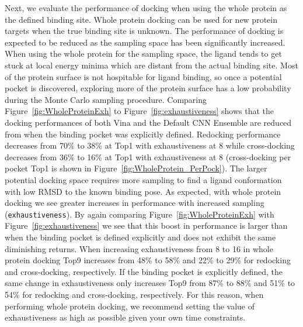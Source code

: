 \documentclass[journal=jcisd8,manuscript=article]{achemso}
\begin{document}
Next, we evaluate the performance of docking when using the whole protein as the defined binding site. Whole protein docking can be used for new protein targets when the true binding site is unknown. The performance of docking is expected to be reduced as the sampling space has been significantly increased. When using the whole protein for the sampling space, the ligand  tends to get stuck at local energy minima which are distant from the actual binding site. Most of the protein surface is not hospitable for ligand binding, so once a potential pocket is discovered, exploring more of the protein surface has a low probability during the Monte Carlo sampling procedure. Comparing Figure~\ref{fig:WholeProteinExh} to Figure~\ref{fig:exhaustiveness} shows that the docking performances of both Vina and the Default CNN Ensemble are reduced from when the binding pocket was explicitly defined. Redocking performance decreases from 70\% to 38\% at Top1 with exhaustiveness at 8 while cross-docking decreases from 36\% to 16\% at Top1 with exhaustiveness at 8 (cross-docking per pocket Top1 is shown in Figure~\ref{fig:WholeProtein_PerPock}). The larger potential docking space requires more sampling to find a ligand conformation with low RMSD to the known binding pose. As expected, with whole protein docking we see greater increases in performance with increased sampling (\texttt{exhaustiveness}). By again comparing Figure~\ref{fig:WholeProteinExh} with Figure~\ref{fig:exhaustiveness} we see that this boost in performance is larger than when the binding pocket is defined explicitly and does not exhibit the same diminishing returns. When increasing exhaustiveness from 8 to 16 in whole protein docking Top9 increases from 48\% to 58\% and 22\% to 29\% for redocking and cross-docking, respectively. If the binding pocket is explicitly defined, the same change in exhaustiveness only increases Top9 from 87\% to 88\% and 51\% to 54\% for redocking and cross-docking, respectively. For this reason, when performing whole protein docking, we recommend setting the value of exhaustiveness as high as possible given your own time constraints.
\end{document}
